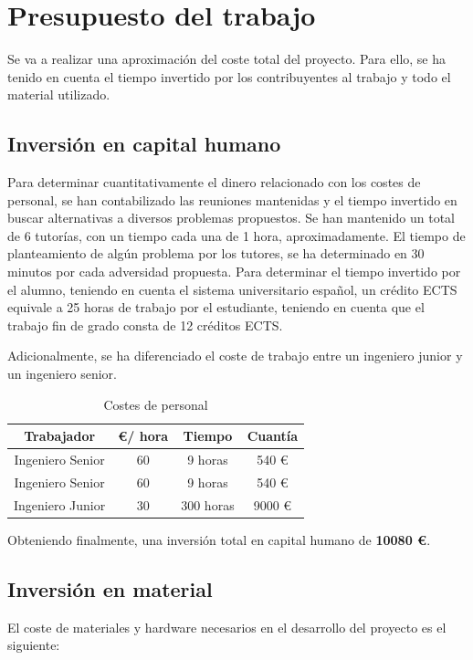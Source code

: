 \documentclass[a4paper,11pt]{book}
\begin{document}
\chapter{Presupuesto del trabajo}
Se va a realizar una aproximación del coste total del proyecto. Para ello, se ha tenido en cuenta el tiempo invertido por los contribuyentes al trabajo y todo el material utilizado.
\section{Inversión en capital humano}
Para determinar cuantitativamente el dinero relacionado con los costes de personal, se han contabilizado las reuniones mantenidas y el tiempo invertido en buscar alternativas a diversos problemas propuestos. Se han mantenido un total de 6 tutorías, con un tiempo cada una de 1 hora, aproximadamente. El tiempo de planteamiento de algún problema por los tutores, se ha determinado en 30 minutos por cada adversidad propuesta. Para determinar el tiempo invertido por el alumno, teniendo en cuenta el sistema universitario español, un crédito ECTS equivale a 25 horas de trabajo por el estudiante, teniendo en cuenta que el trabajo fin de grado consta de 12 créditos ECTS.

Adicionalmente, se ha diferenciado el coste de trabajo entre un ingeniero junior y un ingeniero senior.


\begin{table}[htbp]
\begin{center}
	\begin{tabular}{|c|c|c|c|}
\hline
\textbf{Trabajador} &\textbf{\euro / hora} & \textbf{Tiempo} & \textbf{Cuantía} \\ 
\hline 
Ingeniero Senior & 60 & 9 horas & 540 \euro \\ 
\hline 
Ingeniero Senior & 60 & 9 horas & 540 \euro \\ 
\hline 
Ingeniero Junior & 30 & 300 horas & 9000 \euro \\ 
\hline 
	\end{tabular}
\caption{Costes de personal}
\end{center}
\end{table}

Obteniendo finalmente, una inversión total en capital humano de \textbf{10080 \euro}.


\section{Inversión en material}
El coste de materiales y hardware necesarios en el desarrollo del proyecto es el siguiente:
\end{document}
